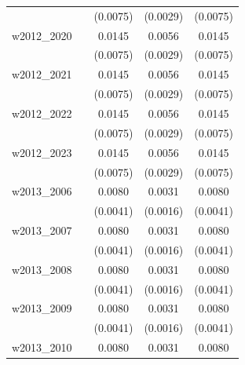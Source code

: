 \begin{table}[htbp]
\begin{tabular}{l*{4}{c}}
            &                     &    (0.0075)         &    (0.0029)         &    (0.0075)         \\
[1em]
w2012\_2020  &                     &      0.0145\sym{*}  &      0.0056\sym{*}  &      0.0145\sym{*}  \\
            &                     &    (0.0075)         &    (0.0029)         &    (0.0075)         \\
[1em]
w2012\_2021  &                     &      0.0145\sym{*}  &      0.0056\sym{*}  &      0.0145\sym{*}  \\
            &                     &    (0.0075)         &    (0.0029)         &    (0.0075)         \\
[1em]
w2012\_2022  &                     &      0.0145\sym{*}  &      0.0056\sym{*}  &      0.0145\sym{*}  \\
            &                     &    (0.0075)         &    (0.0029)         &    (0.0075)         \\
[1em]
w2012\_2023  &                     &      0.0145\sym{*}  &      0.0056\sym{*}  &      0.0145\sym{*}  \\
            &                     &    (0.0075)         &    (0.0029)         &    (0.0075)         \\
[1em]
w2013\_2006  &                     &      0.0080\sym{**} &      0.0031\sym{**} &      0.0080\sym{**} \\
            &                     &    (0.0041)         &    (0.0016)         &    (0.0041)         \\
[1em]
w2013\_2007  &                     &      0.0080\sym{**} &      0.0031\sym{**} &      0.0080\sym{**} \\
            &                     &    (0.0041)         &    (0.0016)         &    (0.0041)         \\
[1em]
w2013\_2008  &                     &      0.0080\sym{**} &      0.0031\sym{**} &      0.0080\sym{**} \\
            &                     &    (0.0041)         &    (0.0016)         &    (0.0041)         \\
[1em]
w2013\_2009  &                     &      0.0080\sym{**} &      0.0031\sym{**} &      0.0080\sym{**} \\
            &                     &    (0.0041)         &    (0.0016)         &    (0.0041)         \\
[1em]
w2013\_2010  &                     &      0.0080\sym{**} &      0.0031\sym{**} &      0.0080\sym{**} \\

\end{tabular}
\end{table}
